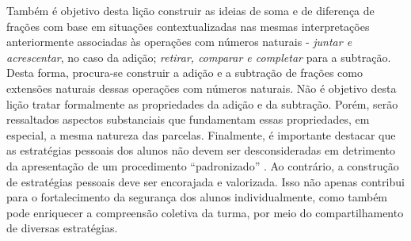   Também é objetivo desta lição construir as ideias de soma e de diferença de frações com base em situações contextualizadas nas mesmas interpretações anteriormente associadas às operações com números naturais -   {\it juntar e acrescentar}, no caso da adição;    {\it retirar, comparar e completar}   para a subtração. Desta forma, procura-se construir a adição e a subtração de frações como extensões naturais dessas operações com números naturais. Não é objetivo desta lição tratar formalmente as propriedades da adição e da subtração. Porém, serão ressaltados aspectos substanciais que fundamentam essas propriedades, em especial, a mesma natureza das parcelas.  
  Finalmente, é importante destacar que as estratégias pessoais dos alunos não devem ser desconsideradas em detrimento da apresentação de um procedimento   ``padronizado''  . Ao contrário, a construção de estratégias pessoais deve ser encorajada e valorizada. Isso não apenas contribui para o fortalecimento da segurança dos alunos individualmente, como também pode enriquecer a compreensão coletiva da turma, por meio do compartilhamento de diversas estratégias.  
 

